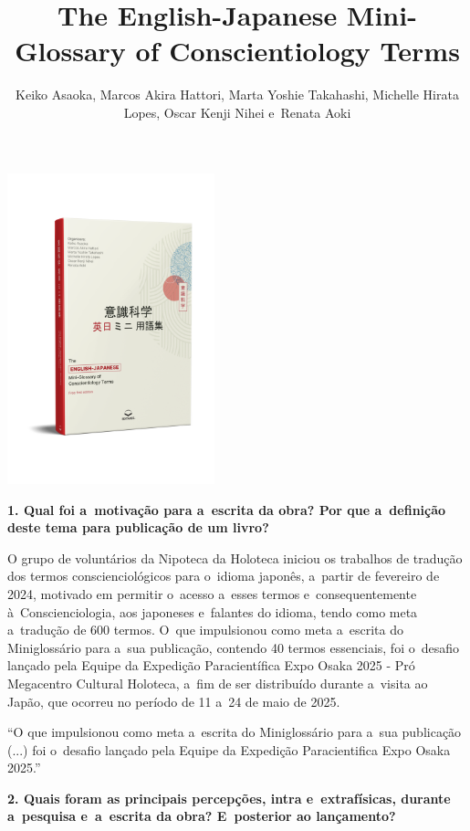 \documentclass{gescons}
\author{Keiko Asaoka, Marcos Akira Hattori, Marta Yoshie Takahashi, Michelle Hirata Lopes, Oscar Kenji Nihei e~Renata Aoki}
\title{The English-Japanese Mini-Glossary of Conscientiology Terms}
\begin{document}
    \makeentrevistatitle

    \begin{multicols}{2}

\begin{center}
    \vspace{-0.5cm}
    \includegraphics[width=6cm]{articles/entrevista/mockups/Mini-Glossary}
\end{center}


\textbf{1. Qual foi a~motivação para a~escrita da obra? Por que a~definição deste tema para publicação de um livro?}

O grupo de voluntários da Nipoteca da Holoteca iniciou os trabalhos de tradução dos termos conscienciológicos para o~idioma japonês, a~partir de fevereiro de 2024, motivado em permitir o~acesso a~esses termos e~consequentemente à~Conscienciologia, aos japoneses e~falantes do idioma, tendo como meta a~tradução de 600 termos. O~que impulsionou como meta a~escrita do Miniglossário para a~sua publicação, contendo 40 termos essenciais, foi o~desafio lançado pela Equipe da Expedição Paracientífica Expo Osaka 2025 - Pró Megacentro Cultural Holoteca, a~fim de ser distribuído durante a~visita ao Japão, que ocorreu no período de 11 a~24 de maio de 2025.

\begin{pullquote}
    ``O que impulsionou como meta a~escrita do Miniglossário para a~sua publicação (...) foi o~desafio lançado pela Equipe da Expedição Paracientifica Expo Osaka 2025.''
\end{pullquote}

\textbf{2. Quais foram as principais percepções, intra e~extrafísicas, durante a~pesquisa e~a~escrita da obra? E~posterior ao lançamento?}



\end{multicols}
\end{document}
